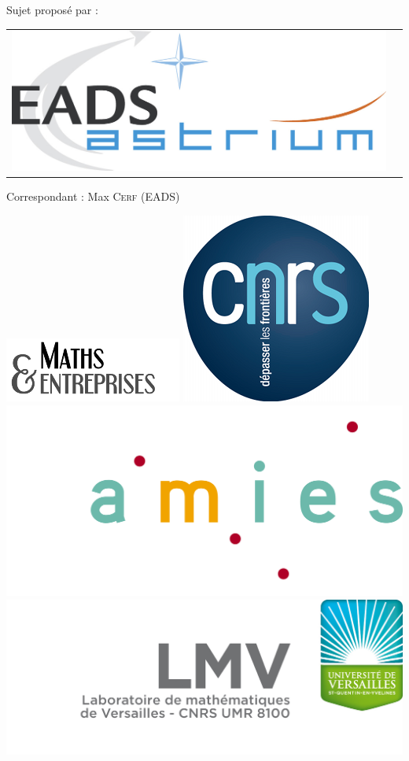 \documentclass[a4paper,11pt]{article}
\numberwithin{section}{part}
\begin{document}
\vfill

\hspace{1cm}Sujet propos\'e par :
\begin{center}
\begin{tabular}{cc}
\includegraphics[scale=.4]{LOGO_EADS_ASTRIUM.jpg} 
\end{tabular}
\end{center}
\begin{center}
  \large \sffamily Correspondant : Max \textsc{Cerf} (EADS)
\end{center}
\vfill
\vspace{3cm}
\includegraphics[width=0.27\linewidth]{logo_GDR_ME} \hfill
\includegraphics[width=0.12\linewidth]{logo_CNRS} \hfill
\includegraphics[width=0.27\linewidth]{logo_AMIES} \hfill
\includegraphics[width=0.30\linewidth]{logo_LMV}
\let\textsc\oldtextsc
\end{document}
